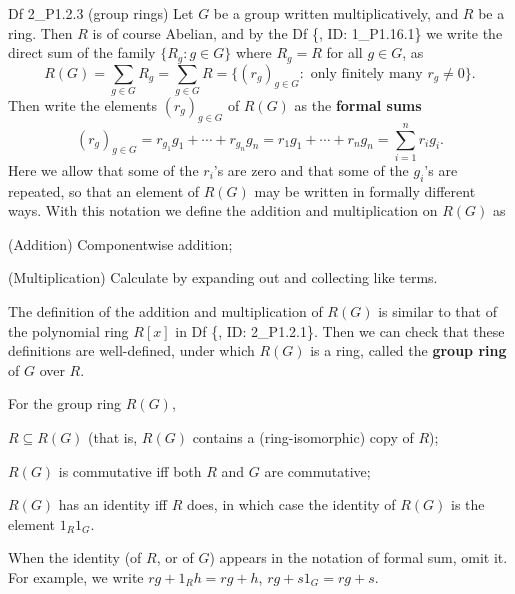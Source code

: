 \documentclass{article}
\begin{document}
\begin{Df}{Df 2\_P1.2.3 (group rings)}
    Let $G$ be a group written multiplicatively, and $R$ be a ring. Then $R$ is of course Abelian, and by the Df \{, ID: 1\_P1.16.1\} we write the direct sum of the family $\{R_g: g\in G\}$ where $R_g = R$ for all $g\in G$, as
    $$ R(G) = \sum_{g\in G} R_g = \sum_{g\in G} R = \{(r_g)_{g\in G}: \text{ only finitely many } r_g\neq 0\}. $$
    Then write the elements $(r_g)_{g\in G}$ of $R(G)$ as the \textbf{formal sums}
    $$ (r_g)_{g\in G} = r_{g_1}g_1 + \cdots + r_{g_n}g_n = r_1g_1 + \cdots + r_ng_n = \sum_{i=1}^n r_ig_i. $$
    Here we allow that some of the $r_i$'s are zero and that some of the $g_i$'s are repeated, so that an element of $R(G)$ may be written in formally different ways. With this notation we define the addition and multiplication on $R(G)$ as
    \begin{compactenum}
        \item (Addition) Componentwise addition; 
        \item (Multiplication) Calculate by expanding out and collecting like terms.
    \end{compactenum}
    The definition of the addition and multiplication of $R(G)$ is similar to that of the polynomial ring $R[x]$ in Df \{, ID: 2\_P1.2.1\}. Then we can check that \textcolor{Th}{these definitions are well-defined, under which $R(G)$ is a ring,} called the \textbf{group ring} of $G$ over $R$.  
\end{Df}

\begin{Rmk}{}
    \textcolor{Th}{For the group ring $R(G)$, 
    \begin{compactenum}
        \item $R\subseteq R(G)$ (that is, $R(G)$ contains a (ring-isomorphic) copy of $R$);
        \item $R(G)$ is commutative iff both $R$ and $G$ are commutative;
        \item $R(G)$ has an identity iff $R$ does, in which case the identity of $R(G)$ is the element $1_R 1_G$.
    \end{compactenum}}
    \textcolor{Df}{When the identity (of $R$, or of $G$) appears in the notation of formal sum, omit it. For example, we write $rg+1_R h = rg + h$, $rg+s1_G = rg + s$.}
\end{Rmk}
\end{document}
